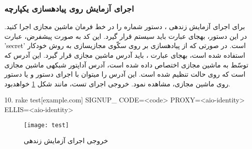 \subsubsection{اجرای آزمایش روی پیاده\nf سازی یکپارچه}
برای اجرای آزمایش زنده\nf ی ، دستور شماره  را در خط فرمان ماشین مجازی  اجرا کنید. در این دستور، به\nf جای عبارت  باید  \textbf{} سیستم قرار گیرد. این کد به صورت پیش\nf فرض، عبارت \textcolor{black}{'secret'} است. در صورتی که از پیاده\nf سازی بر روی سکّوی مجازی\nf سازی به روش خودکار استفاده شده است، به\nf جای عبارت ، باید آدرس  ماشین مجازی قرار گیرد. این آدرس  که توسّط  به ماشین مجازی اختصاص داده شده است، آدرس آداپتور شبکه\nf ی ماشین مجازی است که روی حالت  تنظیم شده است. این آدرس را می\nf توان با اجرای دستور \textbf{} و یا دستور \textbf{} روی ماشین مجازی، مشاهده نمود. خروجی اجرای تست، مانند شکل \ref{livetestpic} خواهدبود.
\begin{latin}
\setlength{\parindent}{0ex}
10. rake test[example.com] SIGNUP\_ CODE=<code> PROXY=<aio-identity> ELLIS=<aio-identity>
\end{latin}

\begin{figure}[H]
\centering
\texttt{[image: test]}
\caption{خروجی اجرای آزمایش زنده\nf ی }
\label{livetestpic}
\end{figure}